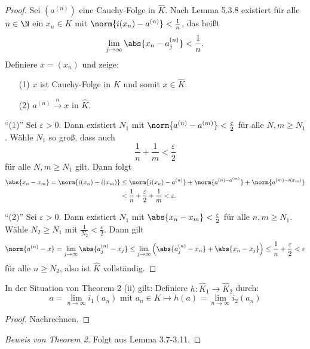 \begin{proof}
Sei $(a^{(n)})$ eine Cauchy-Folge in $\hat{K}$. Nach Lemma 5.3.8 existiert für alle $n\in\N$ ein $x_n\in K$ mit $\norm{i(x_n)-a^{(n)}}< \frac{1}{n}$, das heißt
\[ \lim\limits_{j\to\infty} \abs{x_n-a_j^{(n)}} < \frac{1}{n}.
\]
Definiere $x=(x_n)$ und zeige:
\begin{itemize}
\item[(1)] $x$ ist Cauchy-Folge in $K$ und somit $x \in \hat{K}$.
\item[(2)] $a^{(n)} \xrightarrow{n} x$ in $\hat{K}$.
\end{itemize}
\enquote{(1)} Sei $\varepsilon >0$. Dann existiert $N_1$ mit $\norm{a^{(n)}-a^{(m)}}< \frac{\varepsilon}{2}$ für alle $N,m \geq N_1$. Wähle $N_1$ so groß, dass auch 
\[ \frac{1}{n} + \frac{1}{m} < \frac{\varepsilon}{2}
\]
für alle $N,m \geq N_1$ gilt. Dann folgt
\begin{align*}
\abs{x_n-x_m}
=\norm{i(x_n)-i(x_m)}
&\leq \norm{i(x_n)-a^{(n)}} + \norm{a^{(n)-a^{(m)}}} + \norm{a^{(m)-i(x_m)}} \\
&<\frac{1}{n} + \frac{\varepsilon}{2} + \frac{1}{m}
< \varepsilon.
\end{align*}

\enquote{(2)} Sei $\varepsilon>0$. Dann existiert $N_1$ mit $\abs{x_n-x_m} < \frac{\varepsilon}{2}$  für alle $n,m \geq N_1$. Wähle $N_2 \geq N_1$ mit $\frac{1}{N_2} < \frac{\varepsilon}{2}$. Dann gilt
\begin{align*}
\norm{a^{(n)}-x}
=\lim\limits_{j\to\infty} \abs{a_j^{(n)}-x_j}
\leq \lim\limits_{j\to\infty} \left( \abs{a_j^{(n)}-x_n} + \abs{x_n-x_j} \right)
\leq \frac{1}{n} + \frac{\varepsilon}{2}
< \varepsilon
\end{align*}
für alle $n\geq N_2$, also ist $\hat{K}$ vollständig.
\end{proof}



\begin{Lem}
In der Situation von Theorem 2 (ii) gilt: Definiere $h\colon \hat{K}_1 \to \hat{K}_2$ durch:
\[ a = \lim\limits_{n \to \infty} i_1(a_n) \text{ mit } a_n \in K \mapsto 
h(a) = \lim\limits_{n \to \infty} i_2(a_n)
\]
\end{Lem}

\begin{proof}
Nachrechnen.
\end{proof}

\begin{proof}[Beweis von Theorem 2]
Folgt aus Lemma 3.7-3.11.
\end{proof}

